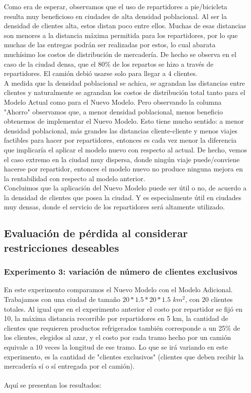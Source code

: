 \documentclass{article}
\begin{document}
Como era de esperar, observamos que el uso de repartidores a pie/bicicleta resulta muy beneficioso en ciudades de alta densidad poblacional. Al ser la densidad de clientes alta, estos distan poco entre ellos. Muchas de esas distancias son menores a la distancia máxima permitida para los repartidores, por lo que muchas de las entregas podrán ser realizadas por estos, lo cual abarata muchísimo los costos de distribución de mercadería. De hecho se observa en el caso de la ciudad densa, que el 80\% de los repartos se hizo a través de repartidores. El camión debió usarse solo para llegar a 4 clientes. \\
A medida que la densidad poblacional se achica, se agrandan las distancias entre clientes y naturalmente se agrandan los costos de distribución total tanto para el Modelo Actual como para el Nuevo Modelo. Pero observando la columna "Ahorro" observamos que, a menor densidad poblacional, menos beneficio obtenemos de implementar el Nuevo Modelo. Esto tiene mucho sentido: a menor densidad poblacional, más grandes las distancias cliente-cliente y menos viajes factibles para hacer por repartidores, entonces es cada vez menor la diferencia que implicaría el aplicar el modelo nuevo con respecto al actual. De hecho, vemos el caso extremo en la ciudad muy dispersa, donde ningún viaje puede/conviene hacerse por repartidor, entonces el modelo nuevo no produce ninguna mejora en la rentabilidad con respecto al modelo anterior. \\
Concluimos que la aplicación del Nuevo Modelo puede ser útil o no, de acuerdo a la densidad de clientes que posea la ciudad. Y es especialmente útil en ciudades muy densas, donde el servicio de los repartidores será altamente utilizado. 


\subsection{Evaluación de pérdida al considerar restricciones deseables}

\subsubsection{Experimento 3: variación de número de clientes exclusivos}

En este experimento comparamos el Nuevo Modelo con el Modelo Adicional. Trabajamos con una ciudad de tamaño $20 * 1.5 * 20 * 1.5$ $km^{2}$, con 20 clientes totales. Al igual que en el experimento anterior el costo por repartidor se fijó en 10, la máxima distancia recorrible por repartidores en 5 km, la cantidad de clientes que requieren productos refrigerados también corresponde a un 25\% de los clientes, elegidos al azar, y el costo por cada tramo hecho por un camión equivale a 10 veces la longitud de ese tramo. Lo que se irá variando en este experimento, es la cantidad de "clientes exclusivos" (clientes que deben recibir la mercadería sí o sí entregada por el camión). \\
\\
Aquí se presentan los resultados: 
\end{document}
